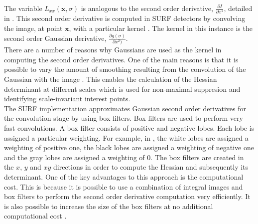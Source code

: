 \documentclass[11pt]{report}
\begin{document}
The variable $L_{xx}(\textbf{x}, \sigma)$ is analogous to the second order derivative, $ \frac{\partial I}{\partial x^2}$, detailed in . This second order derivative is computed in SURF detectors by convolving the image, at point $\textbf{x}$, with a particular kernel \cite{Evans2009}. The kernel in this instance is the second order Gaussian derivative, $\frac{\partial g(\sigma)}{\partial x^2)}$. \\

There are a number of reasons why Gaussians are used as the kernel in computing the second order derivatives. One of the main reasons is that it is possible to vary the amount of smoothing resulting from the convolution of the Gaussian with the image \cite{Evans2009}. This enables the calculation of the Hessian determinant at different scales which is used for non-maximal suppresion and identifying scale-invariant interest points.\\

The SURF implementation approximates Gaussian second order derivatives for the convolution stage by using box filters. Box filters are used to perform very fast convolutions. A box filter consists of positive and negative lobes. Each lobe is assigned a particular weighting. For example, in  \cite{Bay2008}, the white lobes are assigned a weighting of positive one, the black lobes are assigned a weighting of negative one and the gray lobes are assigned a weighting of 0. The box filters are created in the $x$, $y$ and $xy$ directions in order to compute the Hessian and subsequently its determinant. One of the key advantages to this approach is the computational cost. This is because it is possible to use a combination of integral images and box filters to perform the second order derivative computation very efficiently. It is also possible to increase the size of the box filters at no additional computational cost \cite{Bay2008}.\\
\end{document}
